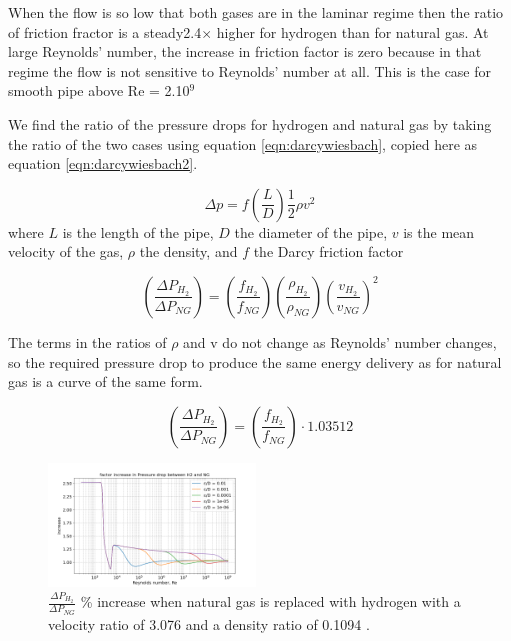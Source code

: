 \documentclass[5p]{elsarticle} %
\begin{document}
When the flow is so low that both gases are in the laminar regime then the ratio of friction fractor is a steady2.4$\times$ higher for hydrogen than for natural gas. At large Reynolds' number, the increase in friction factor is zero because in that regime the flow is not sensitive to Reynolds' number at all. This is the case for smooth pipe above Re = 2.10$^9$

We find the ratio of the pressure drops for hydrogen and natural gas by taking the ratio of the two cases using equation \ref{eqn:darcywiesbach}, copied here as equation \ref{eqn:darcywiesbach2}.

\begin{equation}
\label{eqn:darcywiesbach2}
\Delta p = f \left( \frac{L}{D} \right) \frac{1}{2} \rho v^2
\end{equation}
where $L$ is the length of the pipe,  $D$ the diameter of the pipe,  $v$ is the mean velocity of the gas, $\rho$ the density, and $f$ the Darcy friction factor

\begin{equation}
\label{eqn:pdropratioturb2}
    \left(\frac{\Delta P_{H_2}}{\Delta P_{NG}}\right) = 
    \left(\frac{f_{H_2}}{f_{NG}}\right)
    \left(\frac{\rho_{H_2}}{\rho_{NG}}\right)
    \left(\frac{v_{H_2}}{v_{NG}}\right)^{2} 
\end{equation}

The terms in the ratios of $\rho$ and v do not change as Reynolds' number changes, so the required pressure drop to produce the same energy delivery as for natural gas is a curve of the same form.


\begin{equation}
\label{eqn:pdropratioturb3}
    \left(\frac{\Delta P_{H_2}}{\Delta P_{NG}}\right) = 
    \left(\frac{f_{H_2}}{f_{NG}}\right)
    \cdot
    1.03512
\end{equation}


\begin{figure}[htb]
\centering
\includegraphics[width=0.49\textwidth]{p2_h2_ratio.png}
\caption{$\frac{\Delta P_{H_2}}{\Delta P_{NG}}$ \% increase when natural gas is replaced with hydrogen with a velocity ratio of 3.076 and a density ratio of 0.1094 .}
\label{fig:p2_h2ng}
\end{figure}
\end{document}
